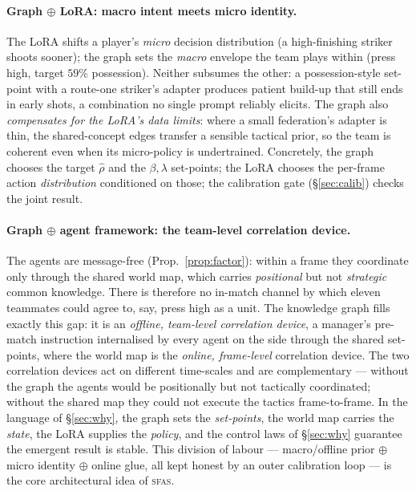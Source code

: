 \documentclass[11pt]{article}
\theoremstyle{definition}
\theoremstyle{remark}
\newcommand{\sfas}{\textsc{sfas}}
\begin{document}
\paragraph{Graph $\oplus$ LoRA: macro intent meets micro identity.} The LoRA shifts a player's \emph{micro} decision distribution (a high-finishing striker shoots sooner); the graph sets the \emph{macro} envelope the team plays within (press high, target $59\%$ possession). Neither subsumes the other: a possession-style set-point with a route-one striker's adapter produces patient build-up that still ends in early shots, a combination no single prompt reliably elicits. The graph also \emph{compensates for the LoRA's data limits}: where a small federation's adapter is thin, the shared-concept edges transfer a sensible tactical prior, so the team is coherent even when its micro-policy is undertrained. Concretely, the graph chooses the target $\hat\rho$ and the $\beta,\lambda$ set-points; the LoRA chooses the per-frame action \emph{distribution} conditioned on those; the calibration gate (\S\ref{sec:calib}) checks the joint result.

\paragraph{Graph $\oplus$ agent framework: the team-level correlation device.} The agents are message-free (Prop.~\ref{prop:factor}): within a frame they coordinate only through the shared world map, which carries \emph{positional} but not \emph{strategic} common knowledge. There is therefore no in-match channel by which eleven teammates could agree to, say, press high as a unit. The knowledge graph fills exactly this gap: it is an \emph{offline, team-level correlation device}, a manager's pre-match instruction internalised by every agent on the side through the shared set-points, where the world map is the \emph{online, frame-level} correlation device. The two correlation devices act on different time-scales and are complementary --- without the graph the agents would be positionally but not tactically coordinated; without the shared map they could not execute the tactics frame-to-frame. In the language of \S\ref{sec:why}, the graph sets the \emph{set-points}, the world map carries the \emph{state}, the LoRA supplies the \emph{policy}, and the control laws of \S\ref{sec:why} guarantee the emergent result is stable. This division of labour --- macro/offline prior $\oplus$ micro identity $\oplus$ online glue, all kept honest by an outer calibration loop --- is the core architectural idea of \sfas.
\end{document}
